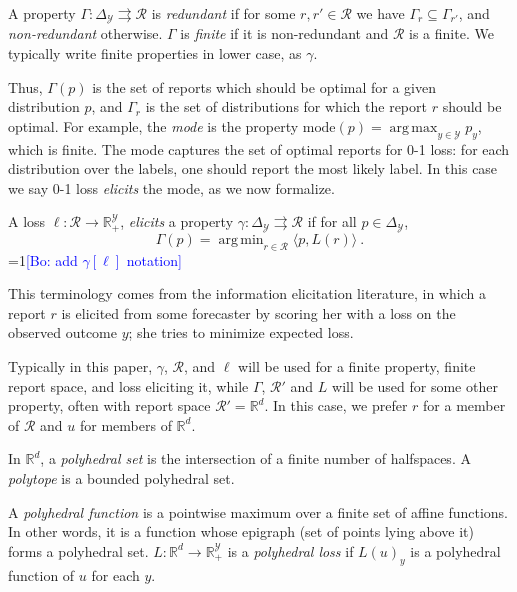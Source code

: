 \documentclass[anon,12pt]{colt2019}
\newcommand{\Comments}{1}
\newcommand{\mynote}[2]{\ifnum\Comments=1\textcolor{#1}{#2}\fi}
\newcommand{\bo}[1]{\mynote{blue}{[Bo: #1]}}
\newcommand{\reals}{\mathbb{R}}
\newcommand{\mode}{\mathrm{mode}}
\newcommand{\simplex}{\Delta_\Y}
\newcommand{\R}{\mathcal{R}}
\newcommand{\Y}{\mathcal{Y}}
\newcommand{\inprod}[2]{\langle #1, #2 \rangle}%
\newcommand{\toto}{\rightrightarrows}
\DeclareMathOperator*{\argmax}{arg\,max}
\DeclareMathOperator*{\argmin}{arg\,min}
\begin{document}
\begin{definition}
  A property $\Gamma:\simplex\toto\R$ is \emph{redundant} if for some $r,r'\in\R$ we have $\Gamma_r \subseteq \Gamma_{r'}$, and \emph{non-redundant} otherwise.
  $\Gamma$ is \emph{finite} if it is non-redundant and $\R$ is a finite.
  We typically write finite properties in lower case, as $\gamma$.
\end{definition}

Thus, $\Gamma(p)$ is the set of reports which should be optimal for a given distribution $p$, and $\Gamma_r$ is the set of distributions for which the report $r$ should be optimal.
For example, the \emph{mode} is the property $\mode(p) = \argmax_{y\in\Y} p_y$, which is finite.
The mode captures the set of optimal reports for 0-1 loss: for each distribution over the labels, one should report the most likely label.
In this case we say 0-1 loss \emph{elicits} the mode, as we now formalize.

\begin{definition}[Elicits]
  A loss $\ell:\R\to\reals^\Y_+$, \emph{elicits} a property $\gamma:\simplex \toto \R$ if for all $p \in \simplex$,
  \begin{equation}
  \Gamma(p) = \argmin_{r \in \R} \inprod{p}{L(r)}~.
  \end{equation}
  \bo{add $\gamma[\ell]$ notation}
\end{definition}
This terminology comes from the information elicitation literature, in which a report $r$ is elicited from some forecaster by scoring her with a loss on the observed outcome $y$; she tries to minimize expected loss.

Typically in this paper, $\gamma$, $\R$, and $\ell$ will be used for a finite property, finite report space, and loss eliciting it, while $\Gamma$, $\R'$ and $L$ will be used for some other property, often with report space $\R' = \reals^d$.
In this case, we prefer $r$ for a member of $\R$ and $u$ for members of $\reals^d$.

In $\reals^d$, a \emph{polyhedral set} is the intersection of a finite number of halfspaces.
A \emph{polytope} is a bounded polyhedral set.
\begin{definition}
  A \emph{polyhedral function} is a pointwise maximum over a finite set of affine functions.
  In other words, it is a function whose epigraph (set of points lying above it) forms a polyhedral set.
  $L: \reals^d \to \reals^{\Y}_+$ is a \emph{polyhedral loss} if $L(u)_y$ is a polyhedral function of $u$ for each $y$.
\end{definition}
\end{document}
